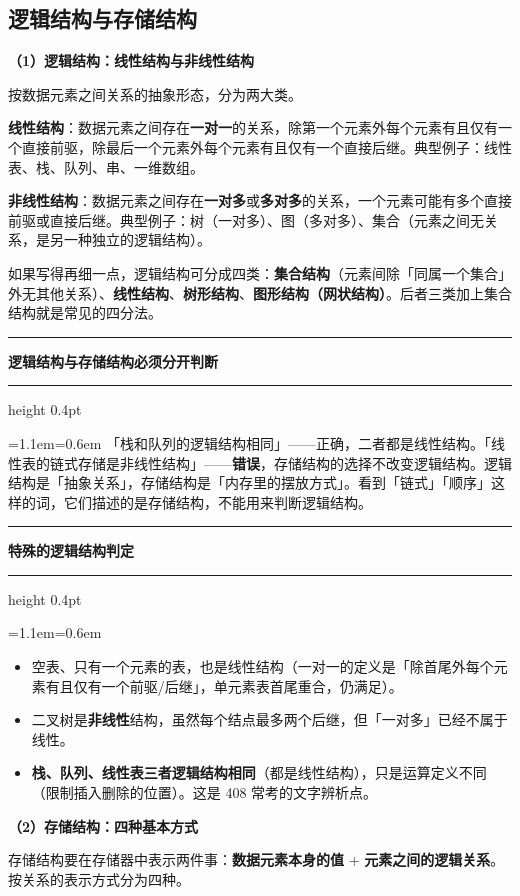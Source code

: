\documentclass[11pt,openany,UTF8]{ctexbook}
\newcommand{\callouthead}[2]{%
  \par\addvspace{7pt}\noindent
  {\color{#1}\rule[-0.15em]{3pt}{1.05em}}\hspace{0.5em}%
  {\bfseries\color{#1}#2}\par\nobreak\vspace{-0.35em}%
  {\color{rulesep}\hrule height 0.4pt}\nobreak\vspace{0.45em}%
  \begingroup\small\setlength{\parindent}{0pt}%
  \leftskip=1.1em\rightskip=0.6em\noindent\ignorespaces}
\newcommand{\calloutend}{\par\endgroup\addvspace{7pt}}
\newenvironment{callkey}[1]{\callouthead{keybar}{#1}}{\calloutend}
\newenvironment{callwarn}[1]{\callouthead{warnbar}{#1}}{\calloutend}
\begin{document}
\subsection{逻辑结构与存储结构}

\textbf{（1）逻辑结构：线性结构与非线性结构}

按数据元素之间关系的抽象形态，分为两大类。

\textbf{线性结构}：数据元素之间存在\textbf{一对一}的关系，除第一个元素外每个元素有且仅有一个直接前驱，除最后一个元素外每个元素有且仅有一个直接后继。典型例子：线性表、栈、队列、串、一维数组。

\textbf{非线性结构}：数据元素之间存在\textbf{一对多}或\textbf{多对多}的关系，一个元素可能有多个直接前驱或直接后继。典型例子：树（一对多）、图（多对多）、集合（元素之间无关系，是另一种独立的逻辑结构）。

如果写得再细一点，逻辑结构可分成四类：\textbf{集合结构}（元素间除「同属一个集合」外无其他关系）、\textbf{线性结构}、\textbf{树形结构}、\textbf{图形结构（网状结构）}。后者三类加上集合结构就是常见的四分法。

\begin{callwarn}{逻辑结构与存储结构必须分开判断}
「栈和队列的逻辑结构相同」——正确，二者都是线性结构。「线性表的链式存储是非线性结构」——\textbf{错误}，存储结构的选择不改变逻辑结构。逻辑结构是「抽象关系」，存储结构是「内存里的摆放方式」。看到「链式」「顺序」这样的词，它们描述的是存储结构，不能用来判断逻辑结构。

\end{callwarn}

\begin{callkey}{特殊的逻辑结构判定}
\begin{itemize}
\item 空表、只有一个元素的表，也是线性结构（一对一的定义是「除首尾外每个元素有且仅有一个前驱/后继」，单元素表首尾重合，仍满足）。
\item 二叉树是\textbf{非线性}结构，虽然每个结点最多两个后继，但「一对多」已经不属于线性。
\item \textbf{栈、队列、线性表三者逻辑结构相同}（都是线性结构），只是运算定义不同（限制插入删除的位置）。这是 408 常考的文字辨析点。
\end{itemize}
\end{callkey}

\textbf{（2）存储结构：四种基本方式}

存储结构要在存储器中表示两件事：\textbf{数据元素本身的值} + \textbf{元素之间的逻辑关系}。按关系的表示方式分为四种。
\end{document}

